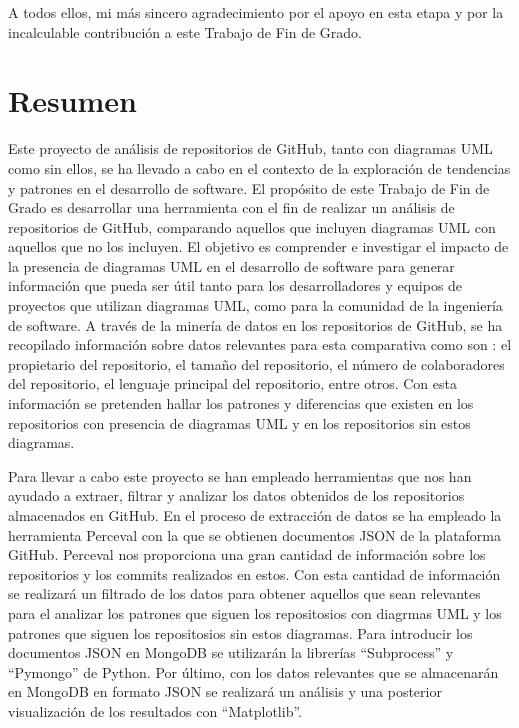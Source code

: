 \documentclass[a4paper, 12pt]{book}
\begin{document}
A todos ellos, mi más sincero agradecimiento por el apoyo en esta etapa y por la incalculable contribución a este Trabajo de Fin de Grado.
 


\chapter*{Resumen}

Este proyecto de análisis de repositorios de GitHub, tanto con diagramas UML como sin ellos, se ha llevado a cabo en el contexto de la exploración de tendencias y patrones en el desarrollo de software.
El propósito de este Trabajo de Fin de Grado es desarrollar una herramienta con el fin de realizar un análisis de repositorios de GitHub, comparando aquellos que incluyen diagramas UML con aquellos que no los incluyen. 
El objetivo es comprender e investigar el impacto de la presencia de diagramas UML en el desarrollo de software para generar información que pueda ser útil tanto para los desarrolladores y equipos de proyectos que utilizan diagramas UML, como para la comunidad de la ingeniería de software. 
A través de la minería de datos en los repositorios de GitHub, se ha recopilado información sobre datos relevantes para esta comparativa como son : el propietario del repositorio, el tamaño del repositorio, el número de colaboradores del repositorio, el lenguaje principal del repositorio, entre otros.
Con esta información se pretenden hallar los patrones y diferencias que existen en los repositorios con presencia de diagramas UML y en los repositorios sin estos diagramas. 


Para llevar a cabo este proyecto se han empleado herramientas que nos han ayudado a extraer, filtrar y analizar los datos obtenidos de los repositorios almacenados en GitHub.
En el proceso de extracción de datos se ha empleado la herramienta Perceval con la que se obtienen documentos JSON de la plataforma GitHub.
Perceval nos proporciona una gran cantidad de información sobre los repositorios y los commits realizados en estos.
Con esta cantidad de información se realizará un filtrado de los datos para obtener aquellos que sean relevantes para el analizar los patrones que siguen los repositosios con diagrmas UML y los patrones que siguen los repositosios sin estos diagramas.
Para introducir los documentos JSON en MongoDB se utilizarán la librerías ``Subprocess'' y ``Pymongo'' de Python.
Por último, con los datos relevantes que se almacenarán en MongoDB en formato JSON se realizará un análisis y una posterior visualización de los resultados con ``Matplotlib''.  
\end{document}
